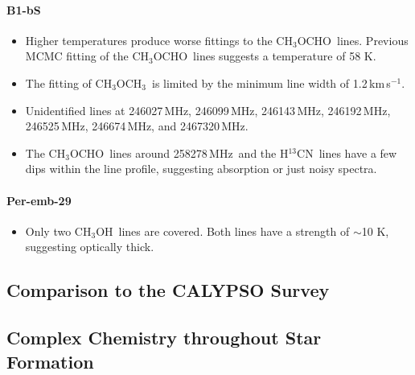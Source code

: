 \documentclass[twocolumn]{aastex62}
\newcommand{\kms}{\mbox{\,km\,s$^{-1}$}}
\newcommand{\mhz}{\mbox{\,MHz}}
\newcommand{\jj}[2]{\mbox{$J = #1\rightarrow#2$}}
\newcommand{\htcn}{\mbox{H$^{13}$CN}}
\newcommand{\methylformate}{\mbox{CH$_{3}$OCHO}}
\newcommand{\methanol}{\mbox{CH$_{3}$OH}}
\newcommand{\dimethylether}{\mbox{CH$_{3}$OCH$_{3}$}}
\newcommand{\sosigma}{\mbox{SO\,$^{3}\Sigma$}}
\begin{document}
\paragraph{B1-bS}
\begin{itemize}
  \item Higher temperatures produce worse fittings to the \methylformate\ lines.  Previous MCMC fitting of the \methylformate\ lines suggests a temperature of 58 K.
  \item The fitting of \dimethylether\ is limited by the minimum line width of 1.2\kms.  
  \item Unidentified lines at 246027\mhz, 246099\mhz, 246143\mhz, 246192\mhz, 246525\mhz, 246674\mhz, and 2467320\mhz.
  \item The \methylformate\ lines around 258278\mhz\ and the \htcn\ lines have a few dips within the line profile, suggesting absorption or just noisy spectra.
\end{itemize}

\paragraph{Per-emb-29}
\begin{itemize}
  \item Only two \methanol\ lines are covered.  Both lines have a strength of $\sim$10 K, suggesting optically thick.
\end{itemize}



\subsection{Comparison to the CALYPSO Survey}
\subsection{Complex Chemistry throughout Star Formation}

\end{document}
